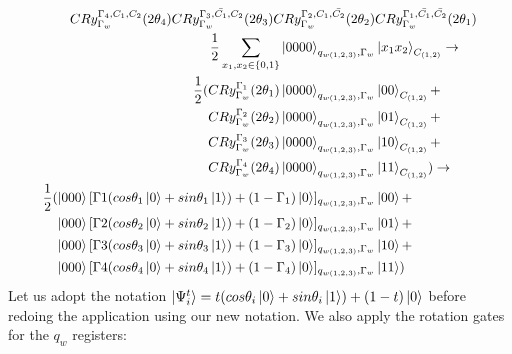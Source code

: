 \begin{equation}
   \resizebox{.9\hsize}{!}{$\begin{split}
        CRy_{\Gamma_w}^{\Gamma_4,C_1,C_2}(2\theta_4)CRy_{\Gamma_w}^{\Gamma_3,\bar{C_1},C_2}(2\theta_3)CRy_{\Gamma_w}^{\Gamma_2,C_1,\bar{C_2}}(2\theta_2)&CRy_{\Gamma_w}^{\Gamma_1,\bar{C_1},\bar{C_2}}(2\theta_1)\\
        \frac{1}{2}\sum_{x_1,x_2\in\{0,1\}}\ket{0000}_{q_{w(1,2,3)},\Gamma_w}&\ket{ x_1x_2}_{C_{(1,2)}}\to\\
        \frac{1}{2}(
        CRy_{\Gamma_w}^{\Gamma_1}(2\theta_1)\ket{0000}_{q_{w(1,2,3)},\Gamma_w}&\ket{ 00}_{C_{(1,2)}}+\\
        CRy_{\Gamma_w}^{\Gamma_2}(2\theta_2)\ket{0000}_{q_{w(1,2,3)},\Gamma_w}&\ket{ 01}_{C_{(1,2)}}+\\
        CRy_{\Gamma_w}^{\Gamma_3}(2\theta_3)\ket{0000}_{q_{w(1,2,3)},\Gamma_w}&\ket{ 10}_{C_{(1,2)}}+\\
        CRy_{\Gamma_w}^{\Gamma_4}(2\theta_4)\ket{0000}_{q_{w(1,2,3)},\Gamma_w}&\ket{ 11}_{C_{(1,2)}})\to\\
        \frac{1}{2}(
        \ket{000}[\Gamma1(cos\theta_1\ket{0}+sin\theta_1\ket{1})+(1-\Gamma_1)\ket{0}]_{q_{w(1,2,3)},\Gamma_w}&\ket{ 00}+\\
        \ket{000}[\Gamma2(cos\theta_2\ket{0}+sin\theta_2\ket{1})+(1-\Gamma_2)\ket{0}]_{q_{w(1,2,3)},\Gamma_w}&\ket{ 01}+\\
        \ket{000}[\Gamma3(cos\theta_3\ket{0}+sin\theta_3\ket{1})+(1-\Gamma_3)\ket{0}]_{q_{w(1,2,3)},\Gamma_w}&\ket{ 10}+\\
        \ket{000}[\Gamma4(cos\theta_4\ket{0}+sin\theta_4\ket{1})+(1-\Gamma_4)\ket{0}]_{q_{w(1,2,3)},\Gamma_w}&\ket{ 11}
        )
   \end{split}$}
\end{equation}
Let us adopt the notation $\ket{\Psi^t_i}=t(cos\theta_i\ket{0}+sin\theta_i\ket{1})+(1-t)\ket{0}$ before redoing the application using our new notation. We also apply the rotation gates for the $q_w$ registers:
